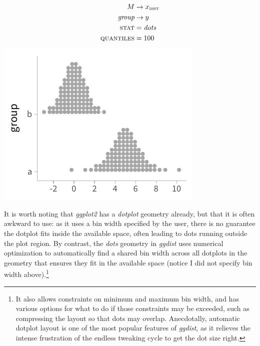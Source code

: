 \documentclass[journal]{vgtc}              %
\begin{document}
\noindent
\begin{minipage}{.5\columnwidth}

\begin{align*}
M &\rightarrow x_\textsc{dist}\\
\textit{group} &\rightarrow y\\
\textsc{stat} &= \mathit{dots}\\
\textsc{quantiles} &= 100
\end{align*}
\end{minipage}%
  \begin{minipage}{.4\columnwidth}
    \centering
    \includegraphics[width=1.2\columnwidth]{figs/3-dots_two.pdf}
  \end{minipage}
\hfill\break

It is worth noting that \textit{ggplot2} has a \textit{dotplot} geometry already, but that it is often awkward to use: as it uses a bin width specified by the user, there is no guarantee the dotplot fits inside the available space, often leading to dots running outside the plot region. By contrast, the \textit{dots} geometry in \textit{ggdist} uses numerical optimization to automatically find a shared bin width across all dotplots in the geometry that ensures they fit in the available space (notice I did not specify bin width above).\footnote{It also allows constraints on minimum and maximum bin width, and has various options for what to do if those constraints may be exceeded, such as compressing the layout so that dots may overlap. Anecdotally, automatic dotplot layout is one of the most popular features of \textit{ggdist}, as it relieves the intense frustration of the endless tweaking cycle to get the dot size right.}
\end{document}
